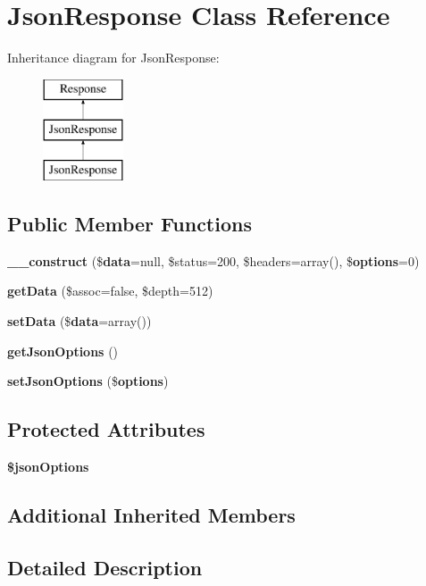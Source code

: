 \section{Json\+Response Class Reference}
\label{class_illuminate_1_1_http_1_1_json_response}
Inheritance diagram for Json\+Response\+:\begin{figure}[H]
\begin{center}
\leavevmode
\includegraphics[height=3.000000cm]{class_illuminate_1_1_http_1_1_json_response}
\end{center}
\end{figure}
\subsection*{Public Member Functions}
\begin{DoxyCompactItemize}
\item 
{\bf \+\_\+\+\_\+construct} (\${\bf data}=null, \$status=200, \$headers=array(), \${\bf options}=0)
\item 
{\bf get\+Data} (\$assoc=false, \$depth=512)
\item 
{\bf set\+Data} (\${\bf data}=array())
\item 
{\bf get\+Json\+Options} ()
\item 
{\bf set\+Json\+Options} (\${\bf options})
\end{DoxyCompactItemize}
\subsection*{Protected Attributes}
\begin{DoxyCompactItemize}
\item 
{\bf \$json\+Options}
\end{DoxyCompactItemize}
\subsection*{Additional Inherited Members}


\subsection{Detailed Description}


